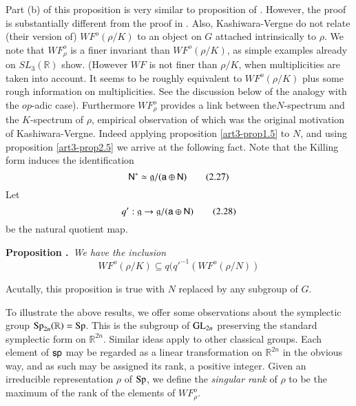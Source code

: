 \begin{remark*}
Part (b) of this proposition is very similar to proposition of \cite{art3-K-V}. However, the proof is substantially different from the proof in \cite{art3-K-V}. Also, Kashiwara-Vergne do not relate (their version of) $WF^{o}(\rho/K)$ to an object on $G$ attached intrinsically to $\rho$. We note that $WF^{o}_{\rho}$ is a finer invariant than $WF^{o}(\rho/K)$, as simple examples already on $SL_{3}(\mathbb{R})$ show. (However $WF$ is not finer than $\rho/K$, when multiplicities are taken into account. It seems to be roughly equivalent to $WF^{o}(\rho/K)$ plus some rough information on multiplicities. See the discussion below of the analogy with the $op$-adic case). Furthermore $WF^{o}_{\rho}$ provides a link between the\pageoriginale $N$-spectrum and the $K$-spectrum of $\rho$, empirical observation of which was the original motivation of Kashiwara-Vergne. Indeed applying proposition \ref{art3-prop1.5} to $N$, and using proposition \ref{art3-prop2.5} we arrive at the following fact. Note that the Killing form induces the identification
\begin{equation*}
\mathsf{N}^{*}\simeq \mathfrak{g}/(\mathsf{a}\oplus \mathsf{N})\tag{2.27}\label{art3-eq2.27}
\end{equation*}
Let
\begin{equation*}
q':\mathfrak{g}\to \mathfrak{g}/(\mathsf{a}\oplus \mathsf{N})\tag{2.28}\label{art3-eq2.28}
\end{equation*}
be the natural quotient map.
\end{remark*}

\medskip
\noindent
{\bf Proposition .\label{art3-prop2.6}}~{\em We have the inclusion}
\begin{equation*}
WF^{o}(\rho/K)\subseteq q({q'}^{-1}(WF^{o}(\rho/N))\tag{2.29}\label{art3-eq2.29}
\end{equation*}

Acutally, this proposition is true with $N$ replaced by any subgroup of $G$. 

To illustrate the above results, we offer some observations about the symplectic group $\operatorname{Sp}_{2n}(\mathbb{R})=\operatorname{Sp}$. This is the subgroup of $\mathrm{GL}_{2n}$ preserving the standard symplectic form on $\mathbb{R}^{2n}$. Similar ideas apply to other classical groups. Each element of $\mathsf{s}\mathsf{p}$ may be regarded as a linear transformation on $\mathbb{R}^{2n}$ in the obvious way, and as such may be assigned its rank, a positive integer. Given an irreducible representation $\rho$ of $\operatorname{Sp}$, we define the {\em singular rank} of $\rho$ to be the maximum of the rank of the elements of $WF^{o}_{\rho}$.

